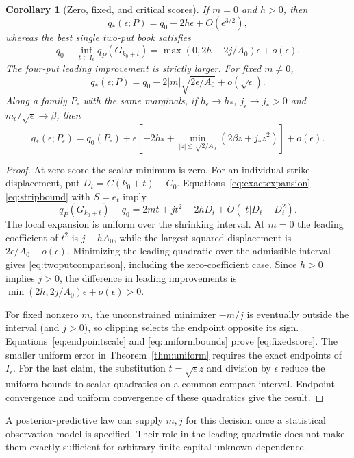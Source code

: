 \documentclass[11pt,a4paper]{amsart}
\theoremstyle{plain}
\newtheorem{corollary}[theorem]{Corollary}
\theoremstyle{definition}
\theoremstyle{remark}
\begin{document}
\begin{corollary}[Zero, fixed, and critical scores]\label{cor:scores}
If $m=0$ and $h>0$, then
\begin{equation}\label{eq:zerofrontier}
 q_*(\epsilon;P)=q_0-2h\epsilon+O(\epsilon^{3/2}),
\end{equation}
whereas the best single two-put book satisfies
\begin{equation}\label{eq:twoputcomparison}
 q_0-\inf_{t\in I_\epsilon}q_P(G_{k_0+t})
 =\max(0,2h-2j/A_0)\epsilon+o(\epsilon).
\end{equation}
The four-put leading improvement is strictly larger. For fixed $m\ne0$,
\begin{equation}\label{eq:fixedscore}
 q_*(\epsilon;P)=q_0-2|m|\sqrt{2\epsilon/A_0}+o(\sqrt\epsilon).
\end{equation}
Along a family $P_\epsilon$ with the same marginals, if $h_\epsilon\to h_*$, $j_\epsilon\to j_*>0$ and $m_\epsilon/\sqrt\epsilon\to\beta$, then
\begin{equation}\label{eq:criticalscore}
 q_*(\epsilon;P_\epsilon)=q_0(P_\epsilon)+\epsilon
 \left[-2h_*+\min_{|z|\le\sqrt{2/A_0}}(2\beta z+j_*z^2)\right]+o(\epsilon).
\end{equation}
\end{corollary}
\begin{proof}
At zero score the scalar minimum is zero. For an individual strike displacement, put $D_t=C(k_0+t)-C_0$. Equations~\eqref{eq:exactexpansion}--\eqref{eq:stripbound} with $S=e_t$ imply
\[
 q_P(G_{k_0+t})-q_0
 =2mt+jt^2-2hD_t+O(|t|D_t+D_t^2).
\]
The local expansion is uniform over the shrinking interval. At $m=0$ the leading coefficient of $t^2$ is $j-hA_0$, while the largest squared displacement is $2\epsilon/A_0+o(\epsilon)$. Minimizing the leading quadratic over the admissible interval gives \eqref{eq:twoputcomparison}, including the zero-coefficient case. Since $h>0$ implies $j>0$, the difference in leading improvements is $\min(2h,2j/A_0)\epsilon+o(\epsilon)>0$.

For fixed nonzero $m$, the unconstrained minimizer $-m/j$ is eventually outside the interval (and $j>0$), so clipping selects the endpoint opposite its sign. Equations~\eqref{eq:endpointscale} and \eqref{eq:uniformbounds} prove \eqref{eq:fixedscore}. The smaller uniform error in Theorem~\ref{thm:uniform} requires the exact endpoints of $I_\epsilon$. For the last claim, the substitution $t=\sqrt\epsilon z$ and division by $\epsilon$ reduce the uniform bounds to scalar quadratics on a common compact interval. Endpoint convergence and uniform convergence of these quadratics give the result.
\end{proof}
A posterior-predictive law can supply $m,j$ for this decision once a statistical observation model is specified. Their role in the leading quadratic does not make them exactly sufficient for arbitrary finite-capital unknown dependence.
\end{document}
